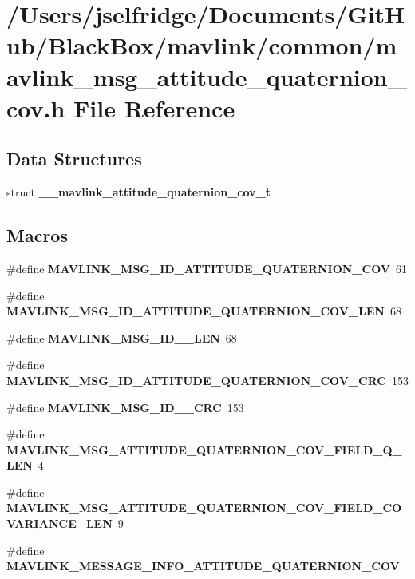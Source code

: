 \section{/\+Users/jselfridge/\+Documents/\+Git\+Hub/\+Black\+Box/mavlink/common/mavlink\+\_\+msg\+\_\+attitude\+\_\+quaternion\+\_\+cov.h File Reference}
\label{mavlink__msg__attitude__quaternion__cov_8h}
\subsection*{Data Structures}
\begin{DoxyCompactItemize}
\item 
struct \textbf{ \+\_\+\+\_\+mavlink\+\_\+attitude\+\_\+quaternion\+\_\+cov\+\_\+t}
\end{DoxyCompactItemize}
\subsection*{Macros}
\begin{DoxyCompactItemize}
\item 
\#define \textbf{ M\+A\+V\+L\+I\+N\+K\+\_\+\+M\+S\+G\+\_\+\+I\+D\+\_\+\+A\+T\+T\+I\+T\+U\+D\+E\+\_\+\+Q\+U\+A\+T\+E\+R\+N\+I\+O\+N\+\_\+\+C\+OV}~61
\item 
\#define \textbf{ M\+A\+V\+L\+I\+N\+K\+\_\+\+M\+S\+G\+\_\+\+I\+D\+\_\+\+A\+T\+T\+I\+T\+U\+D\+E\+\_\+\+Q\+U\+A\+T\+E\+R\+N\+I\+O\+N\+\_\+\+C\+O\+V\+\_\+\+L\+EN}~68
\item 
\#define \textbf{ M\+A\+V\+L\+I\+N\+K\+\_\+\+M\+S\+G\+\_\+\+I\+D\+\_\+\_\+\+L\+EN}~68
\item 
\#define \textbf{ M\+A\+V\+L\+I\+N\+K\+\_\+\+M\+S\+G\+\_\+\+I\+D\+\_\+\+A\+T\+T\+I\+T\+U\+D\+E\+\_\+\+Q\+U\+A\+T\+E\+R\+N\+I\+O\+N\+\_\+\+C\+O\+V\+\_\+\+C\+RC}~153
\item 
\#define \textbf{ M\+A\+V\+L\+I\+N\+K\+\_\+\+M\+S\+G\+\_\+\+I\+D\+\_\+\_\+\+C\+RC}~153
\item 
\#define \textbf{ M\+A\+V\+L\+I\+N\+K\+\_\+\+M\+S\+G\+\_\+\+A\+T\+T\+I\+T\+U\+D\+E\+\_\+\+Q\+U\+A\+T\+E\+R\+N\+I\+O\+N\+\_\+\+C\+O\+V\+\_\+\+F\+I\+E\+L\+D\+\_\+\+Q\+\_\+\+L\+EN}~4
\item 
\#define \textbf{ M\+A\+V\+L\+I\+N\+K\+\_\+\+M\+S\+G\+\_\+\+A\+T\+T\+I\+T\+U\+D\+E\+\_\+\+Q\+U\+A\+T\+E\+R\+N\+I\+O\+N\+\_\+\+C\+O\+V\+\_\+\+F\+I\+E\+L\+D\+\_\+\+C\+O\+V\+A\+R\+I\+A\+N\+C\+E\+\_\+\+L\+EN}~9
\item 
\#define \textbf{ M\+A\+V\+L\+I\+N\+K\+\_\+\+M\+E\+S\+S\+A\+G\+E\+\_\+\+I\+N\+F\+O\+\_\+\+A\+T\+T\+I\+T\+U\+D\+E\+\_\+\+Q\+U\+A\+T\+E\+R\+N\+I\+O\+N\+\_\+\+C\+OV}
\end{DoxyCompactItemize}
